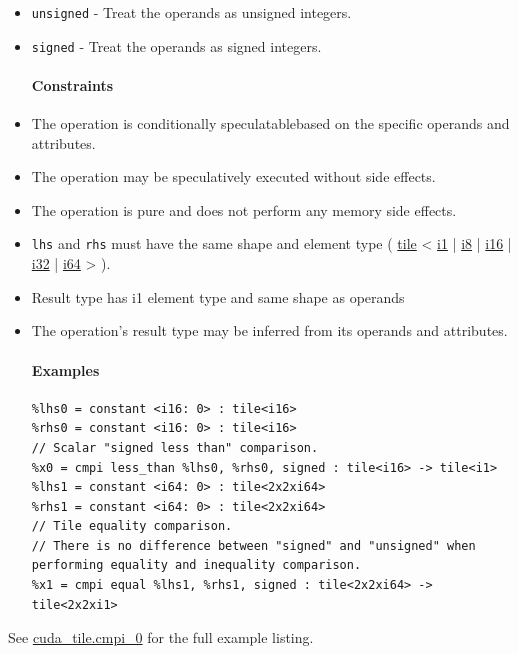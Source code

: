 \documentclass{article}
\begin{document}
\begin{itemize}
\item \texttt{unsigned} - Treat the operands as unsigned integers.
\item \texttt{signed} - Treat the operands as signed integers.


\paragraph{Constraints}

\item The operation is conditionally speculatablebased on the specific operands and attributes.
\item The operation may be speculatively executed without side effects.
\item The operation is pure and does not perform any memory side effects.
\item \texttt{lhs} and \texttt{rhs} must have the same shape and element type ( \href{https://docs.nvidia.com/cuda/tile-ir/latest/sections/types.html#type-tile}{tile} < \href{https://docs.nvidia.com/cuda/tile-ir/latest/sections/types.html#subsection-element-types}{i1} | \href{https://docs.nvidia.com/cuda/tile-ir/latest/sections/types.html#subsection-element-types}{i8} | \href{https://docs.nvidia.com/cuda/tile-ir/latest/sections/types.html#subsection-element-types}{i16} | \href{https://docs.nvidia.com/cuda/tile-ir/latest/sections/types.html#subsection-element-types}{i32} | \href{https://docs.nvidia.com/cuda/tile-ir/latest/sections/types.html#subsection-element-types}{i64} > ).
\item Result type has i1 element type and same shape as operands
\item The operation's result type may be inferred from its operands and attributes.


\paragraph{Examples}

\begin{lstlisting}
%lhs0 = constant <i16: 0> : tile<i16>
%rhs0 = constant <i16: 0> : tile<i16>
// Scalar "signed less than" comparison.
%x0 = cmpi less_than %lhs0, %rhs0, signed : tile<i16> -> tile<i1>
%lhs1 = constant <i64: 0> : tile<2x2xi64>
%rhs1 = constant <i64: 0> : tile<2x2xi64>
// Tile equality comparison.
// There is no difference between "signed" and "unsigned" when performing equality and inequality comparison.
%x1 = cmpi equal %lhs1, %rhs1, signed : tile<2x2xi64> -> tile<2x2xi1>
\end{lstlisting}

\end{itemize}
See \href{https://docs.nvidia.com/cuda/tile-ir/latest/sections/appendix.html#example-cuda-tile-cmpi-0}{cuda\_tile.cmpi\_0} for the full example listing.
\end{document}
